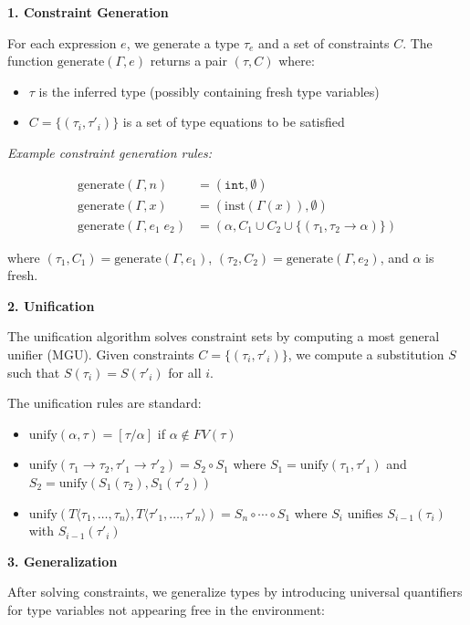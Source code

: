 \documentclass[10pt,letterpaper,twocolumn]{article}
\begin{document}
\textbf{1. Constraint Generation}

For each expression $e$, we generate a type $\tau_e$ and a set of constraints $C$. The function $\text{generate}(\Gamma, e)$ returns a pair $(\tau, C)$ where:
\begin{itemize}
\item $\tau$ is the inferred type (possibly containing fresh type variables)
\item $C = \{(\tau_i, \tau'_i)\}$ is a set of type equations to be satisfied
\end{itemize}

\textit{Example constraint generation rules:}

\begin{align*}
\text{generate}(\Gamma, n) &= (\texttt{int}, \emptyset) \\
\text{generate}(\Gamma, x) &= (\text{inst}(\Gamma(x)), \emptyset) \\
\text{generate}(\Gamma, e_1\;e_2) &= (\alpha, C_1 \cup C_2 \cup \{(\tau_1, \tau_2 \to \alpha)\})
\end{align*}

where $(\tau_1, C_1) = \text{generate}(\Gamma, e_1)$, $(\tau_2, C_2) = \text{generate}(\Gamma, e_2)$, and $\alpha$ is fresh.

\textbf{2. Unification}

The unification algorithm solves constraint sets by computing a most general unifier (MGU). Given constraints $C = \{(\tau_i, \tau'_i)\}$, we compute a substitution $S$ such that $S(\tau_i) = S(\tau'_i)$ for all $i$.

The unification rules are standard:
\begin{itemize}
\item $\text{unify}(\alpha, \tau) = [\tau/\alpha]$ if $\alpha \notin FV(\tau)$
\item $\text{unify}(\tau_1 \to \tau_2, \tau'_1 \to \tau'_2) = S_2 \circ S_1$ where $S_1 = \text{unify}(\tau_1, \tau'_1)$ and $S_2 = \text{unify}(S_1(\tau_2), S_1(\tau'_2))$
\item $\text{unify}(T\langle\tau_1, \ldots, \tau_n\rangle, T\langle\tau'_1, \ldots, \tau'_n\rangle) = S_n \circ \cdots \circ S_1$ where $S_i$ unifies $S_{i-1}(\tau_i)$ with $S_{i-1}(\tau'_i)$
\end{itemize}

\textbf{3. Generalization}

After solving constraints, we generalize types by introducing universal quantifiers for type variables not appearing free in the environment:
\end{document}
